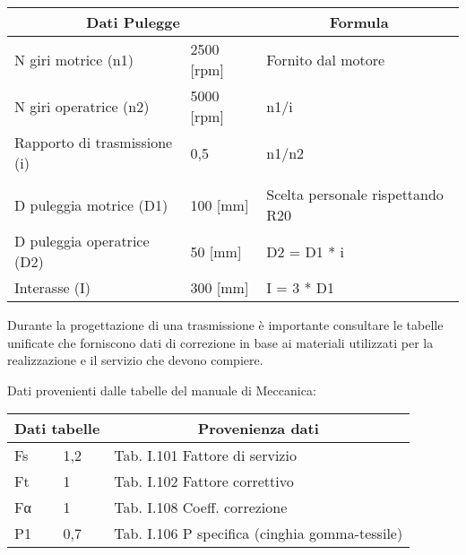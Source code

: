 \documentclass{report}
\begin{document}
\begin{table}[H]
\centering
\begin{tabular}{|l|l|l|}
\hline
\multicolumn{2}{|c|}{\textbf{Dati Pulegge}} & \multicolumn{1}{c|}{\textbf{Formula}} \\ \hline
N giri motrice (n1) & 2500 {[}rpm{]} & Fornito dal motore \\ \hline
N giri operatrice (n2) & 5000 {[}rpm{]} & n1/i \\ \hline
Rapporto di trasmissione (i) & 0,5 & n1/n2 \\ \hline
\multicolumn{3}{|l|}{} \\ \hline
D puleggia motrice (D1) & 100 {[}mm{]} & Scelta personale rispettando R20 \\ \hline
D puleggia operatrice (D2) & 50 {[}mm{]} & D2 = D1 * i \\ \hline
Interasse (I) & 300 {[}mm{]} & I = 3 * D1 \\ \hline
\end{tabular}
\end{table}

Durante la progettazione di una trasmissione è importante consultare le tabelle unificate che forniscono dati di correzione in base ai materiali utilizzati per la realizzazione e il servizio che devono compiere.

Dati provenienti dalle tabelle del manuale di Meccanica:

\begin{table}[H]
\centering
\begin{tabular}{|l|l|l|}
\hline
\multicolumn{2}{|c|}{\textbf{Dati tabelle}} & \multicolumn{1}{c|}{\textbf{Provenienza dati}} \\ \hline
Fs & 1,2 & Tab. I.101 Fattore di servizio \\ \hline
Ft & 1 & Tab. I.102 Fattore correttivo \\ \hline
Fα & 1 & Tab. I.108 Coeff. correzione \\ \hline
P1 & 0,7 & Tab. I.106 P specifica (cinghia gomma-tessile) \\ \hline
\end{tabular}
\end{table}
\end{document}
